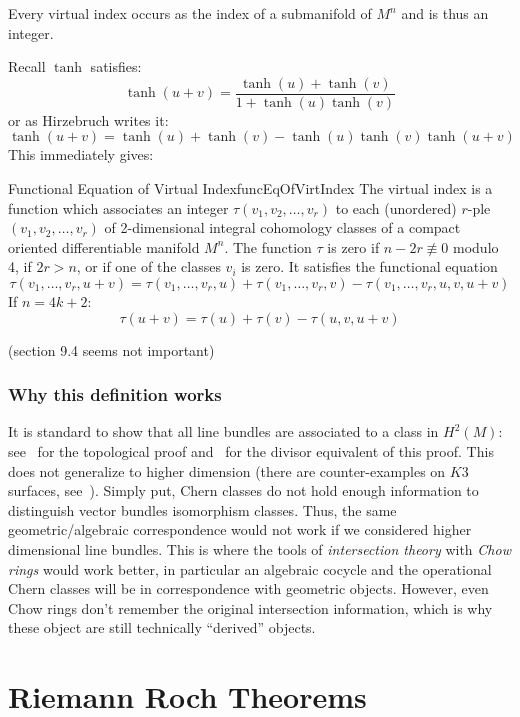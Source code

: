 \documentclass{book}
\begin{document}
Every virtual index occurs as the index of a submanifold of $M^n$ and is thus an integer.

Recall $\tanh$ satisfies:
\[
  \tanh(u+v) = \frac{\tanh(u) + \tanh(v)}{1  +\tanh(u)\tanh(v)}
\]
or as Hirzebruch writes it:
\[
  \tanh(u+v) = \tanh(u) + \tanh(v) - \tanh(u)\tanh(v)\tanh(u+v)
\]
This immediately gives:

\begin{thm}{Functional Equation of Virtual Index}{funcEqOfVirtIndex}
The virtual index is a function which associates an integer $\tau(v_1, v_2, \ldots, v_r)$ to each (unordered)
$r$-ple $(v_1, v_2, \ldots, v_r)$ of 2-dimensional integral cohomology classes of a compact oriented
differentiable manifold $M^n$. The function $\tau$ is zero if $n-2r \not\equiv 0$ modulo 4, if $2r > n$, or if
one of the classes $v_i$ is zero. It satisfies the functional equation
\[
    \tau(v_1,\ldots,v_r,u+v) = \tau(v_1,\ldots,v_r,u) + \tau(v_1,\ldots,v_r,v) - \tau(v_1,\ldots,v_r,u,v,u+v)
\]
If $n = 4k+2$:
\[
  \tau(u+v) = \tau(u) + \tau(v) - \tau(u,v,u+v)
\]
\end{thm}

(section 9.4 seems not important)

\subsection{Why this definition works}

It is standard to show that all line bundles are associated to a class in $H^2(M)$: see~\cite{NateKTheory} for
the topological proof and~\cite{NateAlgGeo} for the divisor equivalent of this proof. This does not generalize
to higher dimension (there are counter-examples on $K3$ surfaces, see~\cite{hatcherVectorBundlesKTheory2017}).
Simply put, Chern classes do not hold enough information to distinguish vector bundles isomorphism classes.
Thus, the same geometric/algebraic correspondence would not work if we considered higher dimensional line
bundles. This is where the tools of \emph{intersection theory} with \emph{Chow rings} would work better, in
particular an algebraic cocycle and the operational Chern classes will be in correspondence with geometric
objects. However, even Chow rings don't remember the original intersection information, which is why these
object are still technically ``derived'' objects.


\chapter{Riemann Roch Theorems}\label{cha:RR}
\end{document}
